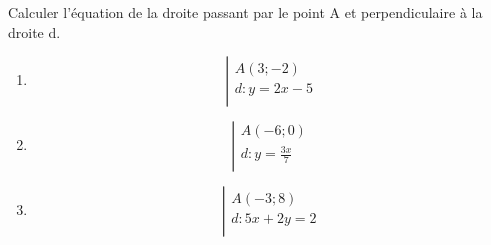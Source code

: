 \begin{exercice}
Calculer l'équation de la droite passant par le point A et perpendiculaire à la droite d.
\begin{multicols}{3}
\begin{enumerate}
\item $$\left| \begin{array}{l}
 A\left( 3;-2 \right) \\ 
d:y=2x-5 \\ 
\end{array} \right.$$
\item $$\left| \begin{array}{l}
 A\left( -6;0 \right) \\ 
d:y=\frac{3x}{7} \\ 
\end{array} \right.$$
\item $$\left| \begin{array}{l}
 A\left( -3;8 \right) \\ 
d:5x+2y=2 \\ 
\end{array} \right.$$
\end{enumerate}
\end{multicols}
\end{exercice}